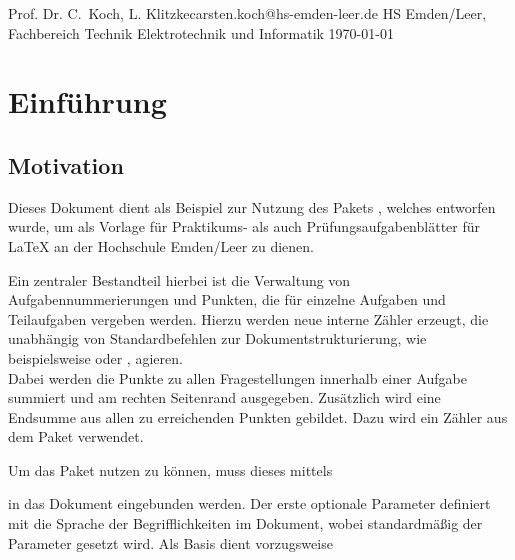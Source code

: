 \documentclass[a4paper,12pt]{article}
\begin{document}
			{Prof. Dr. C.~Koch, L. Klitzke}{carsten.koch@hs-emden-leer.de}
			{HS Emden/Leer, Fachbereich Technik \hfill Elektrotechnik und Informatik}
			{\today}

\begin{samepage}
\printexheader
	
%
\printexreceipt
\end{samepage}
%


\section{Einführung}
%
\subsection{Motivation}
Dieses Dokument dient als Beispiel zur Nutzung des Pakets , welches entworfen wurde, um als Vorlage für Praktikums- als auch Prüfungsaufgabenblätter für {\LaTeX} an der Hochschule Emden/Leer zu dienen.

Ein zentraler Bestandteil hierbei ist die Verwaltung von Aufgabennummerierungen und Punkten, die für einzelne Aufgaben und Teilaufgaben vergeben werden. Hierzu werden neue interne Zähler erzeugt, die unabhängig von Standardbefehlen zur Dokumentstrukturierung, wie beispielsweise \tsetprog{\section}oder \tsetprog{\subsection}\hspace{-2mm}, agieren.\\ Dabei werden die Punkte zu allen Fragestellungen innerhalb einer Aufgabe summiert und am rechten Seitenrand ausgegeben. Zusätzlich wird eine Endsumme aus allen zu erreichenden Punkten gebildet. Dazu wird ein Zähler aus dem Paket  verwendet.

%
Um das Paket nutzen zu können, muss dieses mittels

\tsetprog{\usepackage[en]{hsel-uebungen2015}}

in das Dokument eingebunden werden. Der erste optionale Parameter definiert mit  die Sprache der Begrifflichkeiten im Dokument, wobei standardmäßig der Parameter  gesetzt wird. Als Basis dient vorzugsweise 
\end{document}
